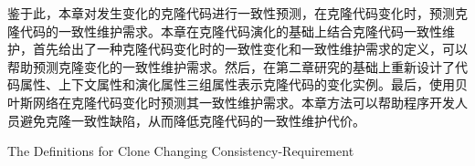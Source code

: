 鉴于此，本章对发生变化的克隆代码进行一致性预测，在克隆代码变化时，预测克隆代码的一致性维护需求。本章在克隆代码演化的基础上结合克隆代码一致性维护，首先给出了一种克隆代码变化时的一致性变化和一致性维护需求的定义，可以帮助预测克隆变化的一致性维护需求。然后，在第二章研究的基础上重新设计了代码属性、上下文属性和演化属性三组属性表示克隆代码的变化实例。最后，使用贝叶斯网络在克隆代码变化时预测其一致性维护需求。本章方法可以帮助程序开发人员避免克隆一致性缺陷，从而降低克隆代码的一致性维护代价。








{The Definitions for Clone Changing Consistency-Requirement}

